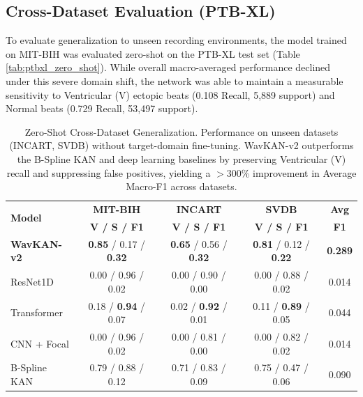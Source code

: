 \documentclass[journal,twoside,web]{ieeecolor}
\begin{document}
\subsection{Cross-Dataset Evaluation (PTB-XL)}
To evaluate generalization to unseen recording environments, the model trained on MIT-BIH was evaluated zero-shot on the PTB-XL test set (Table \ref{tab:ptbxl_zero_shot}). While overall macro-averaged performance declined under this severe domain shift, the network was able to maintain a measurable sensitivity to Ventricular (V) ectopic beats (0.108 Recall, 5,889 support) and Normal beats (0.729 Recall, 53,497 support).

\begin{table}[!t]
\caption{Zero-Shot Cross-Dataset Generalization. Performance on unseen datasets (INCART, SVDB) without target-domain fine-tuning. WavKAN-v2 outperforms the B-Spline KAN and deep learning baselines by preserving Ventricular (V) recall and suppressing false positives, yielding a $>$300\% improvement in Average Macro-F1 across datasets.}
\label{tab:multidataset}
\centering
\footnotesize
\begin{tabular}{@{}l c c c c@{}}
\toprule
\multirow{2}{*}{\textbf{Model}} & \textbf{MIT-BIH} & \textbf{INCART} & \textbf{SVDB} & \textbf{Avg} \\
 & \textbf{V / S / F1} & \textbf{V / S / F1} & \textbf{V / S / F1} & \textbf{F1} \\ \midrule
\textbf{WavKAN-v2} & \textbf{0.85} / 0.17 / \textbf{0.32} & \textbf{0.65} / 0.56 / \textbf{0.32} & \textbf{0.81} / 0.12 / \textbf{0.22} & \textbf{0.289} \\
ResNet1D & 0.00 / 0.96 / 0.02 & 0.00 / 0.90 / 0.00 & 0.00 / 0.88 / 0.02 & 0.014 \\
Transformer & 0.18 / \textbf{0.94} / 0.07 & 0.02 / \textbf{0.92} / 0.01 & 0.11 / \textbf{0.89} / 0.05 & 0.044 \\
CNN + Focal & 0.00 / 0.96 / 0.02 & 0.00 / 0.81 / 0.00 & 0.00 / 0.82 / 0.02 & 0.014 \\
B-Spline KAN & 0.79 / 0.88 / 0.12 & 0.71 / 0.83 / 0.09 & 0.75 / 0.47 / 0.06 & 0.090 \\ \bottomrule
\end{tabular}
\end{table}
\end{document}

